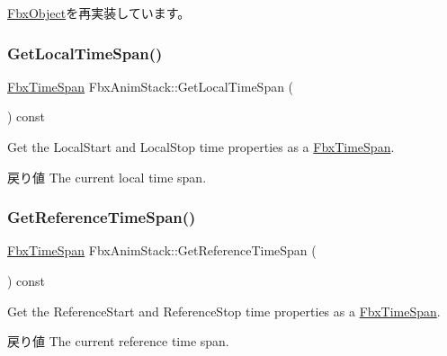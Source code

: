 \hyperlink{class_fbx_object_a123e084d9b32b29c28af6384b7c3c608}{Fbx\+Object}を再実装しています。

\mbox{\label{class_fbx_anim_stack_a61d246d787a9ac3ab230527e9bab00bb}} 
\subsubsection{\texorpdfstring{Get\+Local\+Time\+Span()}{GetLocalTimeSpan()}}
{\footnotesize\ttfamily \hyperlink{class_fbx_time_span}{Fbx\+Time\+Span} Fbx\+Anim\+Stack\+::\+Get\+Local\+Time\+Span (\begin{DoxyParamCaption}{ }\end{DoxyParamCaption}) const}

Get the Local\+Start and Local\+Stop time properties as a \hyperlink{class_fbx_time_span}{Fbx\+Time\+Span}. \begin{DoxyReturn}{戻り値}
The current local time span. 
\end{DoxyReturn}
\mbox{\label{class_fbx_anim_stack_a01aacdecb9d3e1860e015aa364111239}} 
\subsubsection{\texorpdfstring{Get\+Reference\+Time\+Span()}{GetReferenceTimeSpan()}}
{\footnotesize\ttfamily \hyperlink{class_fbx_time_span}{Fbx\+Time\+Span} Fbx\+Anim\+Stack\+::\+Get\+Reference\+Time\+Span (\begin{DoxyParamCaption}{ }\end{DoxyParamCaption}) const}

Get the Reference\+Start and Reference\+Stop time properties as a \hyperlink{class_fbx_time_span}{Fbx\+Time\+Span}. \begin{DoxyReturn}{戻り値}
The current reference time span. 
\end{DoxyReturn}
\mbox{\label{class_fbx_anim_stack_a69f6d38a6b4fa348585674e5d68464b2}} 
